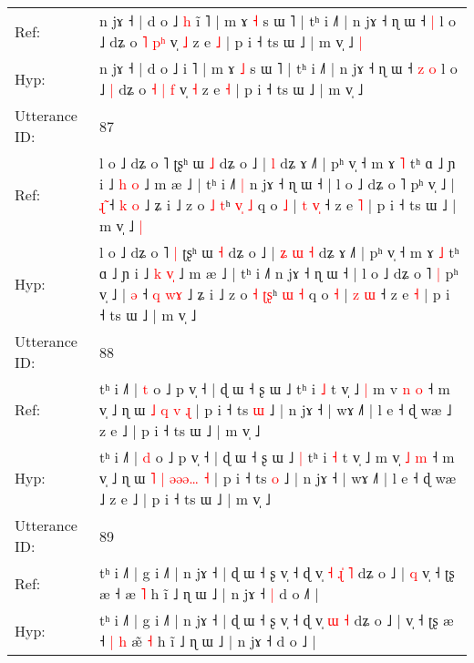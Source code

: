 \documentclass[10pt]{article}
\DeclareRobustCommand{\hl}[1]{{\textcolor{red}{#1}}}
\begin{document}
\begin{longtable}{ll}
Ref: & n jɤ ˧ | d o ˩\hl{ }\hl{h} i\hl{̃} ˥ | m ɤ \hl{˧} s ɯ ˥ | tʰ i ˩˥ | n jɤ ˧ ɳ ɯ ˧\hl{}\hl{} \hl{|} l o ˩\hl{}\hl{} dʑ o \hl{˥} \hl{}\hl{p}\hl{ʰ} v̩ \hl{˩} z e \hl{˩} | p i ˧ ts ɯ ˩ | m v̩ ˩\hl{ }\hl{|}
 \\
Hyp: & n jɤ ˧ | d o ˩\hl{}\hl{} i\hl{} ˥ | m ɤ \hl{˩} s ɯ ˥ | tʰ i ˩˥ | n jɤ ˧ ɳ ɯ ˧\hl{ }\hl{z} \hl{o} l o ˩\hl{ }\hl{|} dʑ o \hl{˧} \hl{|}\hl{ }\hl{f} v̩ \hl{˧} z e \hl{˧} | p i ˧ ts ɯ ˩ | m v̩ ˩\hl{}\hl{}
 \\
\midrule
Utterance ID: & 87 \\
Ref: & l o ˩ dʑ o ˥\hl{}\hl{} ʈʂʰ ɯ \hl{˩} dʑ o ˩ |\hl{}\hl{}\hl{}\hl{} \hl{l} dʑ ɤ ˩˥ | pʰ v̩ ˧ m ɤ \hl{˥} tʰ ɑ ˩ ɲ i ˩ \hl{h} \hl{}\hl{o} ˩ m æ ˩ | tʰ i ˩˥\hl{ }\hl{|} n jɤ ˧ ɳ ɯ ˧ | l o ˩ dʑ o ˥\hl{}\hl{} pʰ v̩ ˩ | \hl{ɻ}\hl{̃} ˧ \hl{k} \hl{}\hl{o} ˩ ʑ i ˩ z o \hl{˩} \hl{}\hl{t}ʰ \hl{v}\hl{̩} \hl{˩} q o \hl{˩} | \hl{t} \hl{v}\hl{̩} ˧ z e \hl{˥} | p i ˧ ts ɯ ˩ | m v̩ ˩\hl{ }\hl{|}
 \\
Hyp: & l o ˩ dʑ o ˥\hl{ }\hl{|} ʈʂʰ ɯ \hl{˧} dʑ o ˩ |\hl{ }\hl{ʑ}\hl{ }\hl{ɯ} \hl{˧} dʑ ɤ ˩˥ | pʰ v̩ ˧ m ɤ \hl{˩} tʰ ɑ ˩ ɲ i ˩ \hl{k} \hl{v}\hl{̩} ˩ m æ ˩ | tʰ i ˩˥\hl{}\hl{} n jɤ ˧ ɳ ɯ ˧ | l o ˩ dʑ o ˥\hl{ }\hl{|} pʰ v̩ ˩ | \hl{}\hl{ə} ˧ \hl{q} \hl{w}\hl{ɤ} ˩ ʑ i ˩ z o \hl{˧} \hl{ʈ}\hl{ʂ}ʰ \hl{}\hl{ɯ} \hl{˧} q o \hl{˧} | \hl{z} \hl{}\hl{ɯ} ˧ z e \hl{˧} | p i ˧ ts ɯ ˩ | m v̩ ˩\hl{}\hl{}
 \\
\midrule
Utterance ID: & 88 \\
Ref: & tʰ i ˩˥ | \hl{t} o ˩ p v̩ ˧ | ɖ ɯ ˧ ʂ ɯ ˩\hl{}\hl{} tʰ i \hl{˩} t v̩ ˩\hl{ }\hl{|} m v\hl{} \hl{n} \hl{o} ˧ m v̩ ˩ ɳ ɯ \hl{˩} \hl{q} \hl{}\hl{}\hl{}\hl{v} \hl{ɻ} | p i ˧ ts \hl{ɯ} ˩ | n jɤ ˧ | wɤ ˩˥ | l e ˧ ɖ wæ ˩ z e ˩ | p i ˧ ts ɯ ˩ | m v̩ ˩
 \\
Hyp: & tʰ i ˩˥ | \hl{d} o ˩ p v̩ ˧ | ɖ ɯ ˧ ʂ ɯ ˩\hl{ }\hl{|} tʰ i \hl{˧} t v̩ ˩\hl{}\hl{} m v\hl{̩} \hl{˩} \hl{m} ˧ m v̩ ˩ ɳ ɯ \hl{˥} \hl{|} \hl{ə}\hl{ə}\hl{ə}\hl{…} \hl{˧} | p i ˧ ts \hl{o} ˩ | n jɤ ˧ | wɤ ˩˥ | l e ˧ ɖ wæ ˩ z e ˩ | p i ˧ ts ɯ ˩ | m v̩ ˩
 \\
\midrule
Utterance ID: & 89 \\
Ref: & tʰ i ˩˥ | g i ˩˥ | n jɤ ˧ | ɖ ɯ ˧ ʂ v̩ ˧ ɖ v̩\hl{ }\hl{˧} \hl{ɻ}\hl{̍} \hl{˥} dʑ o ˩ |\hl{ }\hl{q} v̩ ˧ ʈʂ æ ˧\hl{}\hl{}\hl{}\hl{} æ\hl{} \hl{˥} h ĩ ˩ ɳ ɯ ˩ | n jɤ ˧\hl{ }\hl{|} d o ˩\hl{˥} |
 \\
Hyp: & tʰ i ˩˥ | g i ˩˥ | n jɤ ˧ | ɖ ɯ ˧ ʂ v̩ ˧ ɖ v̩\hl{}\hl{} \hl{}\hl{ɯ} \hl{˧} dʑ o ˩ |\hl{}\hl{} v̩ ˧ ʈʂ æ ˧\hl{ }\hl{|}\hl{ }\hl{h} æ\hl{̃} \hl{˧} h ĩ ˩ ɳ ɯ ˩ | n jɤ ˧\hl{}\hl{} d o ˩\hl{} |

\end{longtable}
\end{document}
